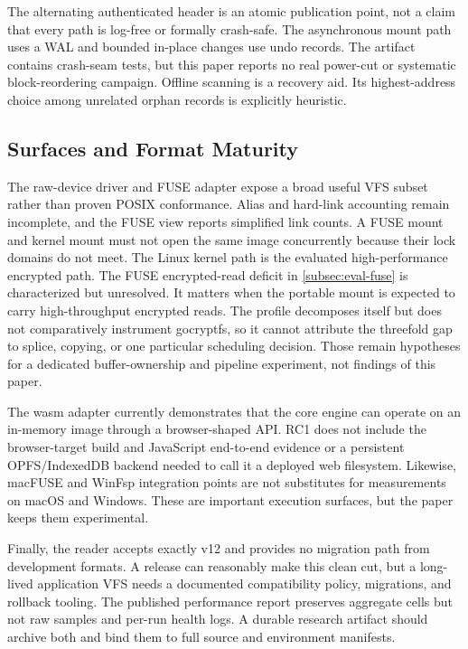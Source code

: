 The alternating authenticated header is an atomic publication point, not a
claim that every path is log-free or formally crash-safe.  The asynchronous
mount path uses a WAL and bounded in-place changes use undo records.  The
artifact contains crash-seam tests, but this paper reports no real power-cut or
systematic block-reordering campaign.  Offline scanning is a recovery aid.  Its
highest-address choice among unrelated orphan records is explicitly heuristic.

\subsection{Surfaces and Format Maturity}

The raw-device driver and FUSE adapter expose a broad useful VFS subset rather
than proven POSIX conformance.  Alias and hard-link accounting remain
incomplete, and the FUSE view reports simplified link counts.  A FUSE mount and
kernel mount must not open the same image concurrently because their lock
domains do not meet.  The Linux kernel path is the evaluated high-performance
encrypted path.  The FUSE encrypted-read deficit in
\cref{subsec:eval-fuse} is characterized but unresolved.  It matters when the
portable mount is expected to carry high-throughput encrypted reads.
The profile decomposes \sfs{} itself but does not comparatively instrument
gocryptfs, so it cannot attribute the threefold gap to splice, copying, or one
particular scheduling decision.  Those remain hypotheses for a dedicated
buffer-ownership and pipeline experiment, not findings of this paper.

The wasm adapter currently demonstrates that the core engine can operate on an
in-memory image through a browser-shaped API.  RC1 does not include the
browser-target build and JavaScript end-to-end evidence or a persistent
OPFS/IndexedDB backend needed to call it a deployed web filesystem.  Likewise,
macFUSE and WinFsp integration points are not substitutes for measurements on
macOS and Windows.  These are important execution surfaces, but the paper keeps
them experimental.

Finally, the reader accepts exactly v12 and provides no migration path from
development formats.  A release can reasonably make this clean cut, but a
long-lived application VFS needs a documented compatibility policy, migrations,
and rollback tooling.  The published performance report preserves aggregate
cells but not raw samples and per-run health logs.  A durable research artifact
should archive both and bind them to full source and environment manifests.
